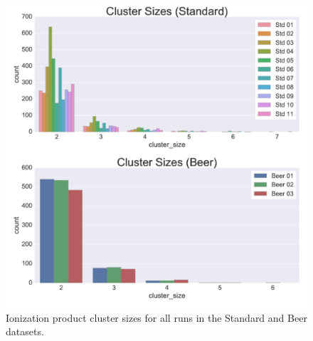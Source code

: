 \begin{figure}[!htbp]
\centering
\includegraphics[width=1.0\linewidth]{05-precursor-cluster/figures/counts_cluster.pdf}
\caption{\label{fig:cluster-counts} Ionization product cluster sizes for all runs in the Standard and Beer datasets.}
\end{figure}


